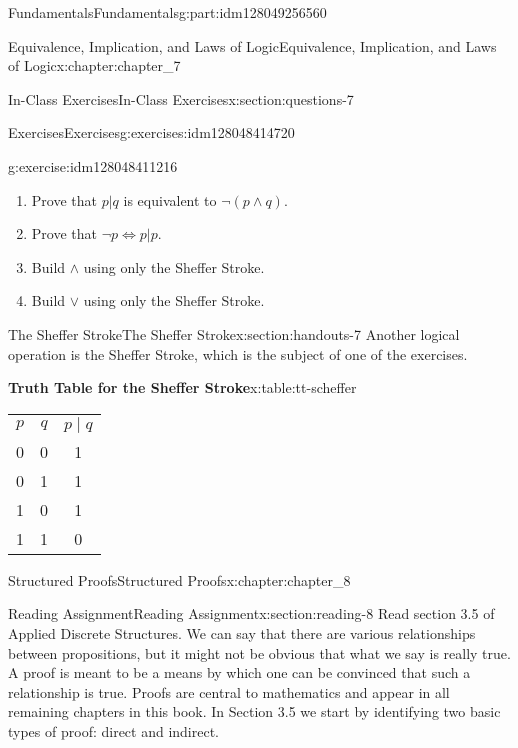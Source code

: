 \documentclass[oneside,10pt,]{book}
\newcommand{\tabularfont}{\relax}
\numberwithin{equation}{section}
\begin{document}
\begin{partptx}{Fundamentals}{}{Fundamentals}{}{}{g:part:idm128049256560}
\begin{chapterptx}{Equivalence, Implication, and Laws of Logic}{}{Equivalence, Implication, and Laws of Logic}{}{}{x:chapter:chapter_7}
\begin{sectionptx}{In-Class Exercises}{}{In-Class Exercises}{}{}{x:section:questions-7}
\begin{exercises-subsection}{Exercises}{}{Exercises}{}{}{g:exercises:idm128048414720}
\begin{exercisegroup}
\begin{divisionexerciseeg}{4}{}{}{g:exercise:idm128048411216}
\begin{enumerate}[label=(\alph*)]
\item{}Prove that \(p | q\) is equivalent to \(\neg (p \land  q)\).%
\item{}Prove that \(\neg p \Leftrightarrow  p | p\).%
\item{}Build \(\land\) using only the Sheffer Stroke.%
\item{}Build \(\lor\) using only the Sheffer Stroke.%
\end{enumerate}
%
\end{divisionexerciseeg}%
\end{exercisegroup}
\par\medskip\noindent
\end{exercises-subsection}
\end{sectionptx}
%
%
\typeout{************************************************}
\typeout{************************************************}
%
\begin{sectionptx}{The Sheffer Stroke}{}{The Sheffer Stroke}{}{}{x:section:handouts-7}
%
Another logical operation is the Sheffer Stroke, which is the subject of one of the exercises.%
\begin{tableptx}{\textbf{Truth Table for the Sheffer Stroke}}{x:table:tt-scheffer}{}%
\centering
{\tabularfont%
\begin{tabular}{ccc}
\(p\)&\(q\)&\(p \mid q\)\tabularnewline[0pt]
0&0&1\tabularnewline[0pt]
0&1&1\tabularnewline[0pt]
1&0&1\tabularnewline[0pt]
1&1&0
\end{tabular}
}%
\end{tableptx}%
\end{sectionptx}
\end{chapterptx}
%
\typeout{************************************************}
\typeout{************************************************}
%
\begin{chapterptx}{Structured Proofs}{}{Structured Proofs}{}{}{x:chapter:chapter_8}
%
%
%
\typeout{************************************************}
\typeout{************************************************}
%
\begin{sectionptx}{Reading Assignment}{}{Reading Assignment}{}{}{x:section:reading-8}
Read section 3.5 of Applied Discrete Structures.  We can say that there are various relationships between propositions, but it might not be obvious that what we say is really true.  A proof is meant to be a means by which one can be convinced that such a relationship is true. Proofs are central to mathematics and appear in all remaining chapters in this book.  In Section 3.5 we start by identifying two basic types of proof: direct and indirect.%

\end{sectionptx}
\end{chapterptx}
\end{partptx}
\end{document}
